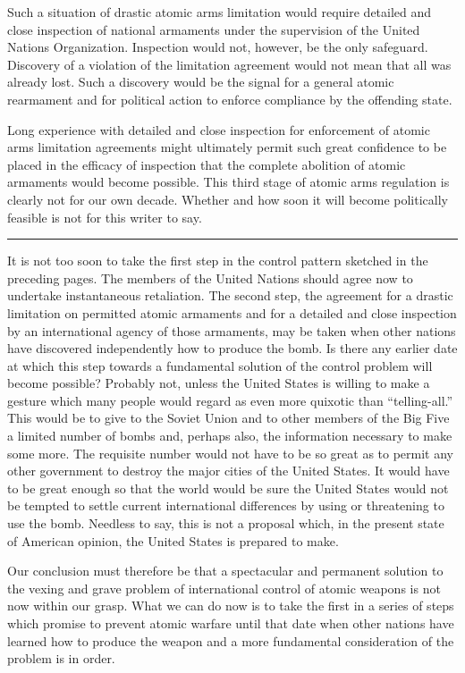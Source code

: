 Such a situation of drastic atomic arms limitation would require detailed and close inspection of national armaments under the supervision of the United Nations Organization. Inspection would not, however, be the only safeguard. Discovery of a violation of the limitation agreement would not mean that all was already lost. Such a discovery would be the signal for a general atomic rearmament and for political action to enforce compliance by the offending state.

Long experience with detailed and close inspection for enforcement of atomic arms limitation agreements might ultimately permit such great confidence to be placed in the efficacy of inspection that the complete abolition of atomic armaments would become possible. This third stage of atomic arms regulation is clearly not for our own decade. Whether and how soon it will become politically feasible is not for this writer to say.

\noindent\hfil\rule{0.4\textwidth}{.4pt}\hfil

\vspace{4pt}

It is not too soon to take the first step in the control pattern sketched in the preceding pages. The members of the United Nations should agree now to undertake instantaneous retaliation. The second step, the agreement for a drastic limitation on permitted atomic armaments and for a detailed and close inspection by an international agency of those armaments, may be taken when other nations have discovered independently how to produce the bomb. Is there any earlier date at which this step towards a fundamental solution of the control problem will become possible? Probably not, unless the United States is  willing to make a gesture which many people would regard as even more quixotic than ``telling-all.'' This would be to give to the Soviet Union and to other members of the Big Five a limited number of bombs and, perhaps also, the information necessary to make some more. The requisite number would not have to be so great as to permit any other government to destroy the major cities of the United States. It would have to be great enough so that the world would be sure the United States would not be tempted to settle current international differences by using or threatening to use the bomb. Needless to say, this is not a proposal which, in the present state of American opinion, the United States is prepared to make.

Our conclusion must therefore be that a spectacular and permanent solution to the vexing and grave problem of international control of atomic weapons is not now within our grasp. What we can do now is to take the first in a series of steps which promise to prevent atomic warfare until that date when other nations have learned how to produce the weapon and a more fundamental consideration of the problem is in order.
